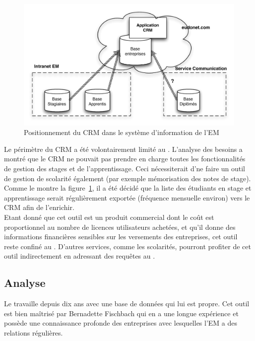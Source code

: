 \documentclass{book}
\begin{document}
\begin{figure}[hbt]
\begin{center}
\includegraphics[width=.9\linewidth]{figs/crm_overview.pdf}
\end{center}
\caption{Positionnement du CRM dans le système d'information de l'EM}
\label{fg:crm_overview}
\end{figure}

Le périmètre du CRM  a été volontairement limité au \sre. L'analyse 
des besoins a montré que le CRM ne pouvait pas prendre en charge 
toutes les fonctionnalités de gestion des stages et de l'apprentissage. 
Ceci nécessiterait d'ne faire un outil de gestion de scolarité également
(par exemple mémorisation des notes de stage). Comme le montre la 
figure~\ref{fg:crm_overview}, il a été décidé que la liste des étudiants 
en stage et apprentissage serait régulièrement exportée (fréquence 
mensuelle environ) vers le CRM afin de l'enrichir.\\

Etant donné que cet outil est un produit commercial dont le coût est
proportionnel au nombre de licences utilisateurs achetées, et qu'il
donne des informations financières sensibles sur les versements des
entreprises, cet outil reste confiné au \sre. D'autres services, comme
les scolarités, pourront profiter de cet outil indirectement en adressant
des requêtes au \sre.

\subsection{Analyse}
Le \sre travaille depuis dix ans avec une base de données qui lui est
propre. Cet outil est bien maîtrisé par Bernadette Fischbach qui en
a une longue expérience et possède une connaissance profonde des 
entreprises avec lesquelles l'EM a des relations régulières. \\
\end{document}
